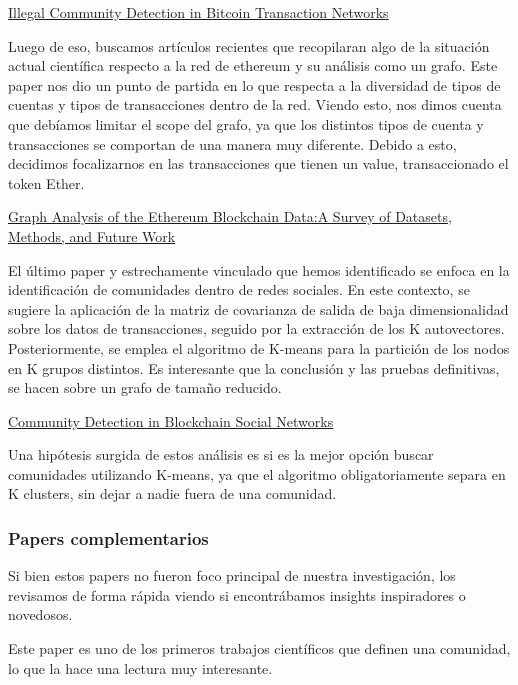 \documentclass{article}
\begin{document}
\href{https://www.mdpi.com/1099-4300/25/7/1069}{Illegal Community Detection in Bitcoin Transaction Networks}
\newline

Luego de eso, buscamos artículos recientes que recopilaran algo de la situación actual científica respecto a la red de ethereum y su análisis como un grafo. Este paper nos dio un punto de partida en lo que respecta a la diversidad de tipos de cuentas y tipos de transacciones dentro de la red. Viendo esto, nos dimos cuenta que debíamos limitar el scope del grafo, ya que los distintos tipos de cuenta y transacciones se comportan de una manera muy diferente. Debido a esto, decidimos focalizarnos en las transacciones que tienen un value, transaccionado el token Ether.
\newline

\href{https://homes.cs.aau.dk/~Arijit/Papers/IEEE_Blockchain_2022_Ethereum_Blockchain_Graph_Data_Survey.pdf}{Graph Analysis of the Ethereum Blockchain Data:A Survey of Datasets, Methods, and Future Work}
\newline

El último paper y estrechamente vinculado que hemos identificado se enfoca en la identificación de comunidades dentro de redes sociales. En este contexto, se sugiere la aplicación de la matriz de covarianza de salida de baja dimensionalidad sobre los datos de transacciones, seguido por la extracción de los K autovectores. Posteriormente, se emplea el algoritmo de K-means para la partición de los nodos en K grupos distintos. Es interesante que la conclusión y las pruebas definitivas, se hacen sobre un grafo de tamaño reducido. 

\href{https://arxiv.org/pdf/2101.06406}{Community Detection in Blockchain Social Networks}
\newline

Una hipótesis surgida de estos análisis es si es la mejor opción buscar comunidades utilizando K-means, ya que el algoritmo obligatoriamente separa en K clusters, sin dejar a nadie fuera de una comunidad. 

\subsubsection{Papers complementarios}
Si bien estos papers no fueron foco principal de nuestra investigación, los revisamos de forma rápida viendo si encontrábamos insights inspiradores o novedosos.

Este paper es uno de los primeros trabajos científicos que definen una comunidad, lo que la hace una lectura muy interesante.
\end{document}
